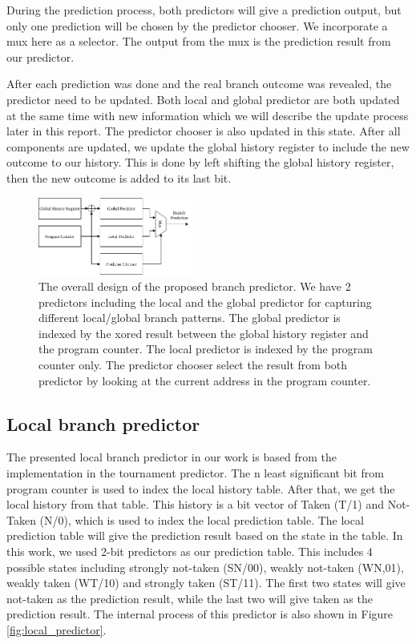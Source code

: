 \documentclass[conference]{IEEEtran}
\begin{document}
During the prediction process, both predictors will give a prediction output, but only one prediction
will be chosen by the predictor chooser. We incorporate a mux here as a selector. The output from the mux
is the prediction result from our predictor.

After each prediction was done and the real branch outcome was revealed, the predictor need to be updated.
Both local and global predictor are both updated at the same time with new information which we will describe
the update process later in this report. The predictor chooser is also updated in this state. After all
components are updated, we update the global history register to include the new outcome to our history.
This is done by left shifting the global history register, then the new outcome is added to its last bit.


\begin{figure}[h]
    \centering
    \includegraphics[width=0.45\textwidth]{imgs/overall_design}
    \caption{The overall design of the proposed branch predictor. We have 2 predictors including
    the local and the global predictor for capturing different local/global branch patterns. The
    global predictor is indexed by the xored result between the global history register and the program
    counter. The local predictor is indexed by the program counter only. The predictor chooser select
    the result from both predictor by looking at the current address in the program counter.}
    \label{fig:overall_design}
\end{figure}

\subsection{Local branch predictor}

The presented local branch predictor in our work is based from the implementation in the tournament
predictor. The n least significant bit from program counter is used to index the local history table.
After that, we get the local history from that table. This history is a bit vector of Taken (T/1) and Not-Taken
(N/0), which is used to index the local prediction table. The local prediction table will give the
prediction result based on the state in the table. In this work, we used 2-bit predictors as our
prediction table. This includes 4 possible states including strongly not-taken (SN/00),
weakly not-taken (WN,01), weakly taken (WT/10) and strongly taken (ST/11). The first two states
will give not-taken as the prediction result, while the last two will give taken as the prediction
result. The internal process of this predictor is also shown in Figure \ref{fig:local_predictor}.
\end{document}
